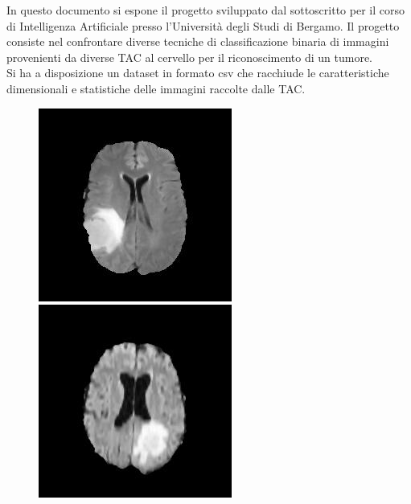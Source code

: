 In questo documento si espone il progetto sviluppato dal sottoscritto per il corso di Intelligenza Artificiale presso l'Università degli Studi di Bergamo.
Il progetto consiste nel confrontare diverse tecniche di classificazione binaria di immagini provenienti da diverse TAC al cervello per il riconoscimento di un tumore.\\
Si ha a disposizione un dataset in formato csv che racchiude le caratteristiche dimensionali e statistiche delle immagini raccolte dalle TAC.\\

\begin{figure}[!htb]
	\includegraphics[width=\linewidth]{image/Image1.jpg}
	\label{fig:immagine01}
	\endminipage\hfill
	\includegraphics[width=\linewidth]{image/Image2.jpg}

\end{figure}
